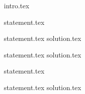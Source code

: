 {intro.tex}

{statement.tex}

{statement.tex}
{solution.tex}

{statement.tex}
{solution.tex}

{statement.tex}

{statement.tex}
{solution.tex}
